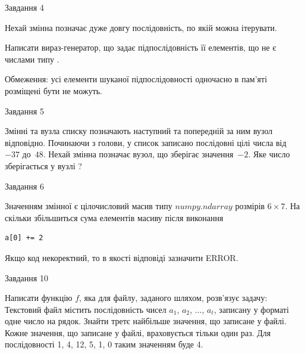 \documentclass[12pt, ukrainian]{article}
\begin{document}
{\begin{minipage}[t]{8.0cm}
\end{minipage}


               
{\begin{center}Завдання {4}\end{center}}
\vspace{-4mm}
Нехай змінна  позначає дуже довгу послідовність, по якій можна ітерувати.

Написати вираз-генератор, що задає підпослідовність її елементів, що не є числами типу .

Обмеження: усі елементи шуканої підпослідовності одночасно в пам'яті розміщені бути не можуть.\par

\vspace{10mm}
               
{\begin{center}Завдання {5}\end{center}}
\vspace{-4mm}
Змінні  та  вузла списку позначають наступний та попередній за ним вузол відповідно. Починаючи з голови, у список записано послідовні цілі числа від~$-37$ до~$48$. Нехай змінна  позначає вузол, що зберігає значення~$-2$.
Яке число зберігається у вузлі  ?\par

               
{\begin{center}Завдання {6}\end{center}}
\vspace{-4mm}
Значенням змінної  є цілочисловий масив типу $numpy.ndarray$ розмірів $6{\times}7$. На скільки збільшиться сума елементів масиву  після виконання
\begin{verbatim}
a[0] += 2
\end{verbatim}


Якщо код некоректний, то в якості відповіді зазначити ERROR.\par

               
{\begin{center}Завдання {10}\end{center}}
\vspace{-4mm}

Написати функцію $f$, яка для файлу, заданого шляхом, розв’язує задачу:\\ Текстовий файл містить послідовність чисел $a_1$, $a_2$, $\ldots$, $a_t$, записану у форматі одне число на рядок. Знайти третє найбільше значення, що записане у файлі. Кожне значення, що записане у файлі, враховується тільки один раз. Для послідовності 1, 4, 12, 5, 1, 0 таким значенням буде 4.

}
\end{document}
